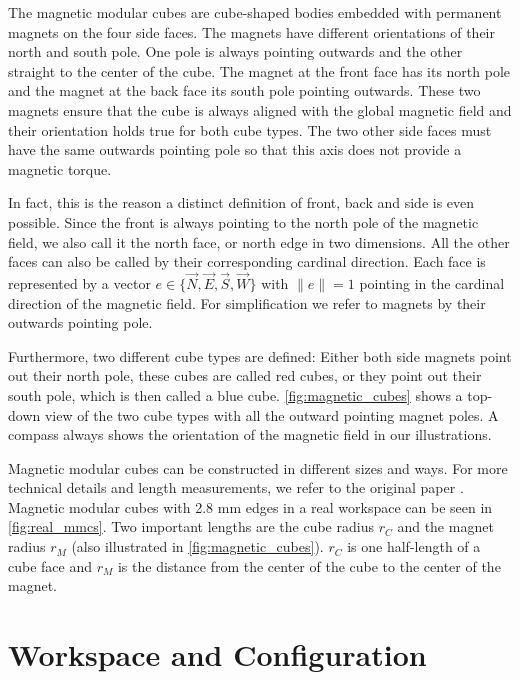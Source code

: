 The magnetic modular cubes are cube-shaped bodies embedded with permanent magnets on the four side faces.
The magnets have different orientations of their north and south pole. 
One pole is always pointing outwards and the other straight to the center of the cube.
The magnet at the front face has its north pole and the magnet at the back face its south pole pointing outwards.
These two magnets ensure that the cube is always aligned with the global magnetic field and their orientation holds true for both cube types.
The two other side faces must have the same outwards pointing pole so that this axis does not provide a magnetic torque.

In fact, this is the reason a distinct definition of front, back and side is even possible.
Since the front is always pointing to the north pole of the magnetic field, we also call it the north face, or north edge in two dimensions.
All the other faces can also be called by their corresponding cardinal direction.
Each face is represented by a vector $e \in \{ \vec{N},\vec{E},\vec{S},\vec{W}\}$ with $\lVert e \rVert = 1$ pointing in the cardinal direction of the magnetic field.
For simplification we refer to magnets by their outwards pointing pole.

Furthermore, two different cube types are defined:
Either both side magnets point out their north pole, these cubes are called red cubes, or they point out their south pole, which is then called a blue cube.
\autoref{fig:magnetic_cubes} shows a top-down view of the two cube types with all the outward pointing magnet poles.
A compass always shows the orientation of the magnetic field in our illustrations.

Magnetic modular cubes can be constructed in different sizes and ways. For more technical details and length measurements, we refer to the original paper \cite{Bhattacharjee2022}.
Magnetic modular cubes with 2.8 mm edges in a real workspace can be seen in \autoref{fig:real_mmcs}.
Two important lengths are the cube radius $r_C$ and the magnet radius $r_M$ (also illustrated in \autoref{fig:magnetic_cubes}).
$r_C$ is one half-length of a cube face and $r_M$ is the distance from the center of the cube to the center of the magnet.



\section{Workspace and Configuration}
\label{sec:workspace}


